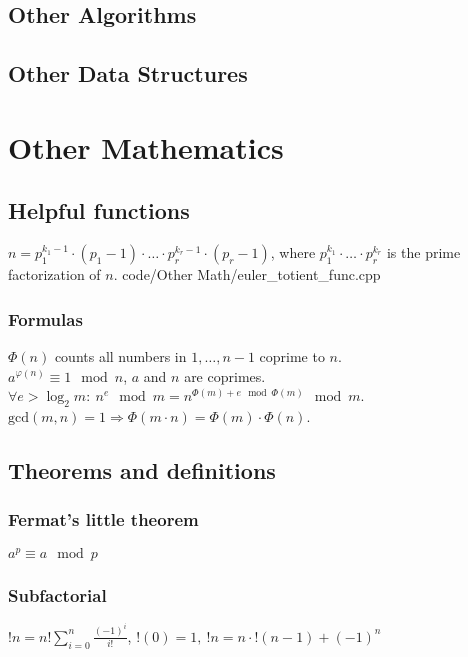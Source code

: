 \documentclass[
	a4paper,
	landscape,
	10pt,
]{article}
\begin{document}
\subsection{Other Algorithms}
\subsection{Other Data Structures}

\section{Other Mathematics}
	\subsection{Helpful functions}
		{
			$n = p_1^{k_1-1}\cdot(p_1-1) \cdot \hdots \cdot p_r^{k_r-1}\cdot(p_r-1)$, where $p_1^{k_1} \cdot \hdots \cdot p_r^{k_r}$ is the prime factorization of $n$.
		}
		{code/Other Math/euler_totient_func.cpp}
		\subsubsection*{Formulas}
			$\Phi(n)$ counts all numbers in ${1,\hdots,n-1}$ coprime to $n$. \\
			$a^{\varphi (n)} \equiv 1 \mod n$, $a$ and $n$ are coprimes. \\
			$\forall e > \log_2 m:~ n^e \mod m = n^{\Phi(m) + e \mod \Phi(m)} \mod m$. \\
			$\text{gcd}(m,n) = 1 \Rightarrow \Phi(m\cdot n) = \Phi(m) \cdot \Phi(n)$. \\

	\subsection{Theorems and definitions}
		\subsubsection*{Fermat's little theorem}
		$a^p \equiv a \mod p$
		\subsubsection*{Subfactorial}
		$!n = n! \sum_{i=0}^{n} \frac{(-1)^i}{i!}$, 
		$!(0) = 1, ~ !n = n \cdot !(n-1) + (-1)^n$
\end{document}
